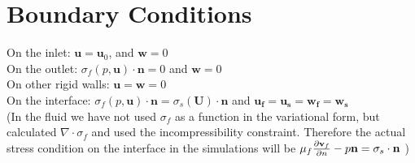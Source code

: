 \documentclass{article}
\begin{document}
\section{Boundary Conditions}
On the inlet: $\mathbf{u} = \mathbf{u}_0$, and $\mathbf{w} = 0$ \\
On the outlet: $\sigma_f(p,\mathbf{u})\cdot \mathbf{n} = 0$ and $\mathbf{w} = 0$\\
On other rigid walls: $\mathbf{u} = \mathbf{w} = 0$  \\
On the interface: $\sigma_f(p,\mathbf{u}) \cdot \mathbf{n} = \sigma_s(\mathbf{U}) \cdot\mathbf{n} $ and $\mathbf{u_f} = \mathbf{u_s} = \mathbf{w_f} = \mathbf{w_s} $ \\

(In the fluid we have not used $\sigma_f$ as a function in the variational form, but calculated $\nabla \cdot \sigma_f$ and used the incompressibility constraint. Therefore the actual stress condition on the interface in the simulations will be
$ \mu_f \frac{\partial \mathbf{v}_f}{\partial n} - p\mathbf{n} = \sigma_s \cdot \mathbf{n}$ )
\end{document}
